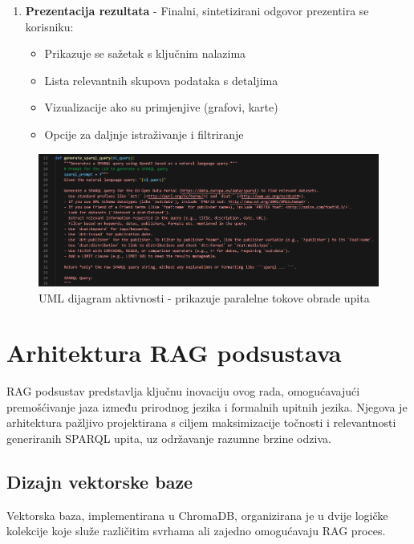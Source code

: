 \begin{enumerate}
    \item \textbf{Prezentacija rezultata} - Finalni, sintetizirani odgovor prezentira se korisniku:
    \begin{itemize}
        \item Prikazuje se sažetak s ključnim nalazima
        \item Lista relevantnih skupova podataka s detaljima
        \item Vizualizacije ako su primjenjive (grafovi, karte)
        \item Opcije za daljnje istraživanje i filtriranje
    \end{itemize}
\end{enumerate}

\begin{figure}[htbp]
    \centering
    \includegraphics[width=1\textwidth]{figures/izvjestaj_image_13.png}
    \caption{UML dijagram aktivnosti - prikazuje paralelne tokove obrade upita}
    \label{fig:activity_diagram_uml}
\end{figure}

\section{Arhitektura RAG podsustava}

RAG podsustav predstavlja ključnu inovaciju ovog rada, omogućavajući premošćivanje jaza između prirodnog jezika i formalnih upitnih jezika. Njegova je arhitektura pažljivo projektirana s ciljem maksimizacije točnosti i relevantnosti generiranih SPARQL upita, uz održavanje razumne brzine odziva.

\subsection{Dizajn vektorske baze}

Vektorska baza, implementirana u ChromaDB, organizirana je u dvije logičke kolekcije koje služe različitim svrhama ali zajedno omogućavaju RAG proces.

